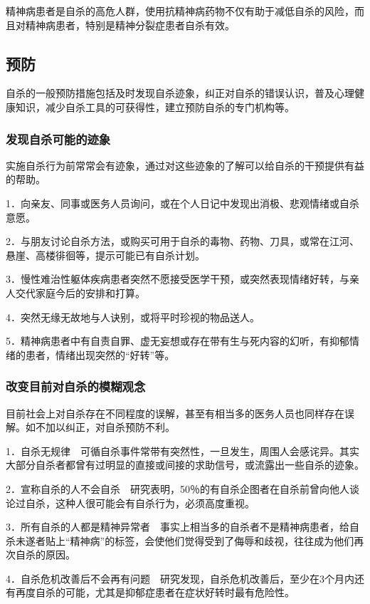 精神病患者是自杀的高危人群，使用抗精神病药物不仅有助于减低自杀的风险，而且对精神病患者，特别是精神分裂症患者自杀有效。

\subsection{预防}

自杀的一般预防措施包括及时发现自杀迹象，纠正对自杀的错误认识，普及心理健康知识，减少自杀工具的可获得性，建立预防自杀的专门机构等。

\subsubsection{发现自杀可能的迹象}

实施自杀行为前常常会有迹象，通过对这些迹象的了解可以给自杀的干预提供有益的帮助。

1．向亲友、同事或医务人员询问，或在个人日记中发现出消极、悲观情绪或自杀意愿。

2．与朋友讨论自杀方法，或购买可用于自杀的毒物、药物、刀具，或常在江河、悬崖、高楼徘徊等，提示可能已有自杀计划。

3．慢性难治性躯体疾病患者突然不愿接受医学干预，或突然表现情绪好转，与亲人交代家庭今后的安排和打算。

4．突然无缘无故地与人诀别，或将平时珍视的物品送人。

5．精神病患者中有自责自罪、虚无妄想或存在带有生与死内容的幻听，有抑郁情绪的患者，情绪出现突然的“好转”等。

\subsubsection{改变目前对自杀的模糊观念}

目前社会上对自杀存在不同程度的误解，甚至有相当多的医务人员也同样存在误解。如不加以纠正，对自杀预防不利。

1．自杀无规律　可循自杀事件常带有突然性，一旦发生，周围人会感诧异。其实大部分自杀者都曾有过明显的直接或间接的求助信号，或流露出一些自杀的迹象。

2．宣称自杀的人不会自杀　研究表明，50％的有自杀企图者在自杀前曾向他人谈论过自杀，这种人很可能会有自杀行为，必须高度重视。

3．所有自杀的人都是精神异常者　事实上相当多的自杀者不是精神病患者，给自杀未遂者贴上“精神病”的标签，会使他们觉得受到了侮辱和歧视，往往成为他们再次自杀的原因。

4．自杀危机改善后不会再有问题　研究发现，自杀危机改善后，至少在3个月内还有再度自杀的可能，尤其是抑郁症患者在症状好转时最有危险性。

